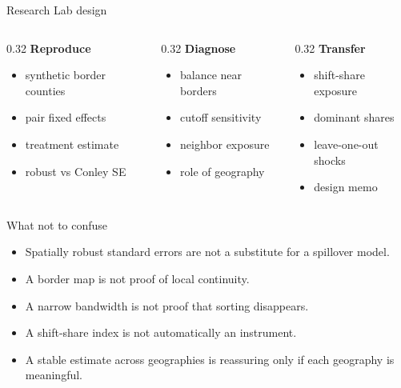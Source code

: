 \documentclass[aspectratio=169,11pt]{beamer}
\newcommand{\1}{\mathbf{1}}
\begin{document}
\begin{frame}{Research Lab design}
\begin{columns}[T,onlytextwidth]
\begin{column}{0.32\linewidth}
\textbf{Reproduce}
\begin{itemize}
    \item synthetic border counties
    \item pair fixed effects
    \item treatment estimate
    \item robust vs Conley SE
\end{itemize}
\end{column}
\begin{column}{0.32\linewidth}
\textbf{Diagnose}
\begin{itemize}
    \item balance near borders
    \item cutoff sensitivity
    \item neighbor exposure
    \item role of geography
\end{itemize}
\end{column}
\begin{column}{0.32\linewidth}
\textbf{Transfer}
\begin{itemize}
    \item shift-share exposure
    \item dominant shares
    \item leave-one-out shocks
    \item design memo
\end{itemize}
\end{column}
\end{columns}
\end{frame}

\begin{frame}{What not to confuse}
\begin{itemize}
    \item Spatially robust standard errors are not a substitute for a spillover model.
    \item A border map is not proof of local continuity.
    \item A narrow bandwidth is not proof that sorting disappears.
    \item A shift-share index is not automatically an instrument.
    \item A stable estimate across geographies is reassuring only if each geography is meaningful.
\end{itemize}
\end{frame}
\end{document}
